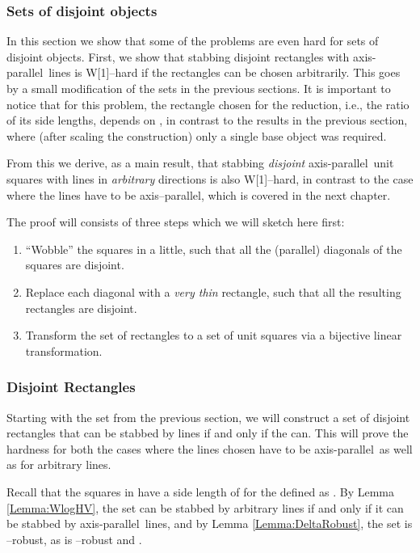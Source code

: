 \documentclass[12pt]{article}
\newcommand{\cclass}[1]{{#1}}
\newcommand{\wone}{\cclass{W[1]}}
\newcommand{\ap}{a.p.\ }
\renewcommand{\ap}{axis-parallel\ }
\begin{document}
\subsubsection{Sets of disjoint objects}

In this section we show that some of the problems are even hard for sets of disjoint objects. First, we show that stabbing disjoint rectangles with \ap lines is \wone--hard if the rectangles can be chosen arbitrarily. This goes by a small modification of the sets in the previous sections. It is important to notice that for this problem, the rectangle chosen for the reduction, i.e., the ratio of its side lengths, depends on , in contrast to the results in the previous section, where (after scaling the construction) only a single base object was required. 

From this we derive, as a main result, that stabbing \emph{disjoint} \ap unit squares with lines in \emph{arbitrary} directions is also \wone--hard, in contrast to the case where the lines have to be axis--parallel, which is covered in the next chapter.

The proof will consists of three steps which we will sketch here first:
\begin{enumerate}
	\item ``Wobble'' the squares in  a little, such that all the (parallel) diagonals of the squares are disjoint.
	\item Replace each diagonal with a \emph{very thin} rectangle, such that all the resulting rectangles are disjoint.
	\item Transform the set of rectangles to a set of unit squares via a bijective linear transformation.
\end{enumerate}


\subsubsection{Disjoint Rectangles}
Starting with the set  from the previous section, we will construct a set of disjoint rectangles  that can be stabbed by  lines if and only if the  can. This will prove the hardness for both the cases where the lines chosen have to be \ap as well as for arbitrary lines.

Recall that the squares in  have a side length of  for the  defined as . By Lemma \ref{Lemma:WlogHV}, the set  can be stabbed by  arbitrary lines if and only if it can be stabbed by  \ap lines, and by Lemma \ref{Lemma:DeltaRobust}, the set  is --robust, as  is --robust and .
\end{document}
